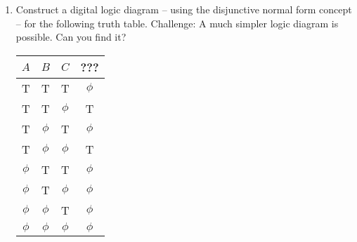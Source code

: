 \documentclass{amsart}
\begin{document}
\begin{enumerate}
Using the notion of {\em disjunctive normal form}\footnote{Recall that disjunctive normal form consists of the ``or'' of a bunch of ``and'' statements that recognize the rows we want to be true.} determine an expression that only uses $\land$, $\lor$ and $\lnot$ that is equivalent to $A \oplus B$.

\vfill


\item Construct a digital logic diagram -- using the disjunctive normal form concept -- for the following truth table.  Challenge: A much simpler logic diagram is possible.  Can you find it?

\vspace{.2in}

\begin{tabular}{c|c|c||c}
 $A$ &  $B$ &  $C$ & ???\\ \hline
T & T & T & $\phi$ \\
T & T & $\phi$ & T \\
T & $\phi$ & T & $\phi$ \\
T & $\phi$ &  $\phi$ & T\\
$\phi$ & T & T & $\phi$\\
$\phi$ & T & $\phi$ & $\phi$\\
$\phi$ & $\phi$ & T & $\phi$\\
$\phi$ & $\phi$ &  $\phi$ & $\phi$\\
\end{tabular}


\vfill

\end{enumerate}
\end{document}
